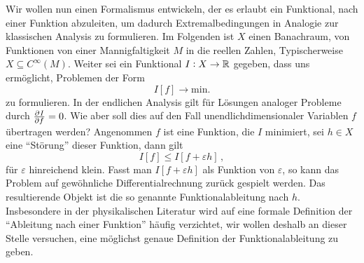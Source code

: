 Wir wollen nun einen Formalismus entwickeln, der es erlaubt ein Funktional, nach
einer Funktion abzuleiten, um dadurch Extremalbedingungen in
Analogie zur klassischen Analysis zu formulieren.  
Im Folgenden ist $X$ einen Banachraum, von Funktionen von einer Mannigfaltigkeit
$M$ in die reellen Zahlen, Typischerweise $X\subseteq C^\infty(M)$.
Weiter sei ein Funktional $I:X\to\mathbb{R}$ gegeben, dass uns ermöglicht, Problemen
der Form
\begin{equation}
I[f]\to \mathrm{min.}
\end{equation}
zu formulieren. In der endlichen Analysis gilt für Lösungen analoger
Probleme durch $\pd{I}{f}=0$.
Wie aber soll dies auf den Fall unendlichdimensionaler Variablen $f$ übertragen
werden? 
Angenommen $f$ ist eine Funktion, die $I$ minimiert, sei $h\in X$ eine
"`Störung"' dieser Funktion, dann gilt
\begin{equation}
I[f]\leq I[f+\varepsilon h]\,,
\end{equation} 
für $\varepsilon$ hinreichend klein. Fasst man $I[f+\varepsilon h]$ als Funktion
von $\varepsilon$, so kann das Problem auf gewöhnliche Differentialrechnung
zurück gespielt werden.
Das resultierende Objekt ist die so genannte Funktionalableitung nach $h$.
Insbesondere in der physikalischen Literatur wird auf
eine formale Definition der "`Ableitung nach einer Funktion"' häufig verzichtet, wir
wollen deshalb an dieser Stelle versuchen, eine möglichst genaue Definition der
Funktionalableitung zu geben.
